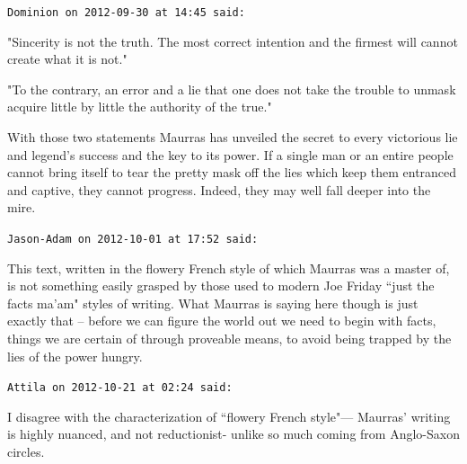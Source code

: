 \begin{footnotesize}\begin{sffamily}



\texttt{Dominion on 2012-09-30 at 14:45 said: }

"Sincerity is not the truth. The most correct intention and the firmest will cannot create what it is not."

"To the contrary, an error and a lie that one does not take the trouble to unmask acquire little by little the authority of the true."

With those two statements Maurras has unveiled the secret to every victorious lie and legend's success and the key to its power. If a single man or an entire people cannot bring itself to tear the pretty mask off the lies which keep them entranced and captive, they cannot progress. Indeed, they may well fall deeper into the mire.


\hfill

\texttt{Jason-Adam on 2012-10-01 at 17:52 said: }

This text, written in the flowery French style of which Maurras was a master of, is not something easily grasped by those used to modern Joe Friday ``just the facts ma'am" styles of writing. What Maurras is saying here though is just exactly that – before we can figure the world out we need to begin with facts, things we are certain of through proveable means, to avoid being trapped by the lies of the power hungry.


\hfill

\texttt{Attila on 2012-10-21 at 02:24 said: }

I disagree with the characterization of ``flowery French style"— Maurras' writing is highly nuanced, and not reductionist- unlike so much coming from Anglo-Saxon circles.


\end{sffamily}\end{footnotesize}
